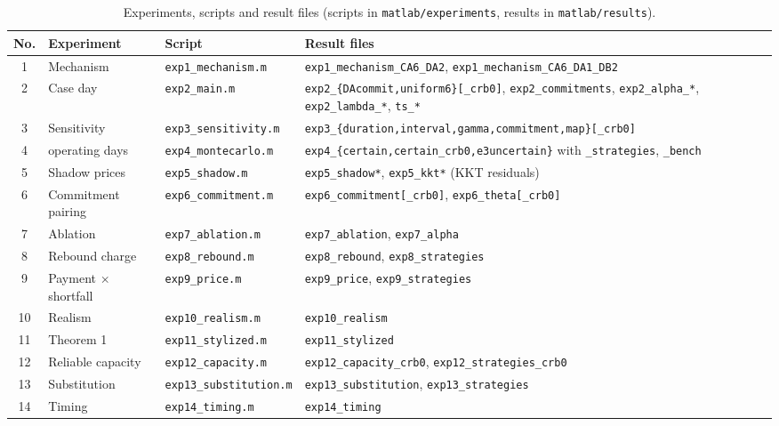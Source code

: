 \begin{table}[!t]
\caption{Experiments, scripts and result files (scripts in \texttt{matlab/experiments}, results in \texttt{matlab/results}).}
\label{tab:repro}
\centering\scriptsize
\setlength{\tabcolsep}{4pt}
\begin{tabularx}{\textwidth}{@{}c>{\raggedright\arraybackslash}p{}>{\raggedright\arraybackslash}p{}X@{}}
\toprule
No. & Experiment & Script & Result files\\
\midrule
1 & Mechanism & \texttt{exp1\_mechanism.m} & \texttt{exp1\_mechanism\_CA6\_DA2}, \texttt{exp1\_mechanism\_CA6\_DA1\_DB2}\\
2 & Case day & \texttt{exp2\_main.m} & \texttt{exp2\_\{DAcommit,uniform6\}[\_crb0]}, \texttt{exp2\_commitments}, \texttt{exp2\_alpha\_*}, \texttt{exp2\_lambda\_*}, \texttt{ts\_*}\\
3 & Sensitivity & \texttt{exp3\_sensitivity.m} & \texttt{exp3\_\{duration,interval,gamma,commitment,map\}[\_crb0]}\\
4 & 52 operating days & \texttt{exp4\_montecarlo.m} & \texttt{exp4\_\{certain,certain\_crb0,e3uncertain\}} with \texttt{\_strategies}, \texttt{\_bench}\\
5 & Shadow prices & \texttt{exp5\_shadow.m} & \texttt{exp5\_shadow*}, \texttt{exp5\_kkt*} (KKT residuals)\\
6 & Commitment pairing & \texttt{exp6\_commitment.m} & \texttt{exp6\_commitment[\_crb0]}, \texttt{exp6\_theta[\_crb0]}\\
7 & Ablation & \texttt{exp7\_ablation.m} & \texttt{exp7\_ablation}, \texttt{exp7\_alpha}\\
8 & Rebound charge & \texttt{exp8\_rebound.m} & \texttt{exp8\_rebound}, \texttt{exp8\_strategies}\\
9 & Payment $\times$ shortfall & \texttt{exp9\_price.m} & \texttt{exp9\_price}, \texttt{exp9\_strategies}\\
10 & Realism & \texttt{exp10\_realism.m} & \texttt{exp10\_realism}\\
11 & Theorem 1 & \texttt{exp11\_stylized.m} & \texttt{exp11\_stylized}\\
12 & Reliable capacity & \texttt{exp12\_capacity.m} & \texttt{exp12\_capacity\_crb0}, \texttt{exp12\_strategies\_crb0}\\
13 & Substitution & \texttt{exp13\_substitution.m} & \texttt{exp13\_substitution}, \texttt{exp13\_strategies}\\
14 & Timing & \texttt{exp14\_timing.m} & \texttt{exp14\_timing}\\

\end{tabularx}
\end{table}
